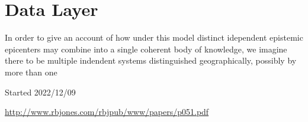 \documentclass[10pt,titlepage]{article}
\begin{document}
\section{Data Layer}

In order to give an account of how under this model distinct idependent epistemic epicenters may combine into a single coherent body of knowledge, we imagine there to be multiple indendent systems distinguished geographically, possibly by more than one 

\appendix

{}





\tiny{
Started 2022/12/09


\href{http://www.rbjones.com/rbjpub/www/papers/p051.pdf}{http://www.rbjones.com/rbjpub/www/papers/p051.pdf}

}%
\end{document}
